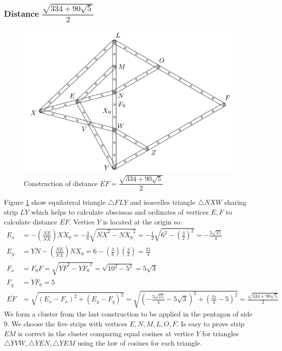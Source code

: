 \documentclass[11pt]{article}
\begin{document}
\subsubsection{Distance $\dfrac{\sqrt{334 + 90\sqrt5}}2$}

\begin{figure}[H]
\centering
\includegraphics[scale=1]{9/cluster9b2}
\caption{Construction of distance $\overline{EF}=\dfrac{\sqrt{334 + 90\sqrt5}}2$}
\label{fig:cluster9b2}
\end{figure}

Figure \ref{fig:cluster9b2} show equilateral triangle $\triangle{FLY}$ and isoscelles triangle $\triangle{NXW}$ sharing strip $\overline{LY}$ which helps to calculate abscissas and ordinates of vertices $E,F$ to calculate distance $\overline{EF}$. Vertice $Y$ is located at the origin so:
\begin{align}
E_x &= - \left(\frac{\overline{NE}}{\overline{NX}}\right)\overline{XX_0}
 = -\frac{3}6\sqrt{\overline{NX}^2 - \overline{NX_0}^2}
 = -\frac{1}{2}\sqrt{6^2 - \left(\frac{3}2\right)^2} = -\frac{3\sqrt{15}}4 \\
E_y &= \overline{YN} - \left(\frac{\overline{NE}}{\overline{NX}}\right)\overline{NX_0}
 = 6 - \left(\frac{3}6\right)\left(\frac{3}2\right) = \frac{21}4\\
F_x &= \overline{F_0F} = \sqrt{\overline{YF}^2 - \overline{YF_0}^2}
 = \sqrt{10^2 - 5^2} = 5\sqrt3\\
F_y &= \overline{YF_0} = 5\\
\overline{EF} &= \sqrt{(E_x - F_x)^2 + (E_y - F_y)^2}
 = \sqrt{\left(-\frac{3\sqrt{15}}{4} -5\sqrt3 \right)^2 + \left(\frac{21}4 - 5\right)^2}
 = \frac{\sqrt{334+90\sqrt5}}2
\end{align}
We form a cluster from the last construction to be applied in the pentagon of side $9$. We choose the five strips with vertices $E,N,M,L,O,F$. Is easy to prove strip $\overline{EM}$ is correct in the cluster comparing equal cosines at vertice $Y$ for triangles $\triangle{YVW},\triangle{YEN},\triangle{YEM}$ using the law of cosines for each triangle.
\end{document}
